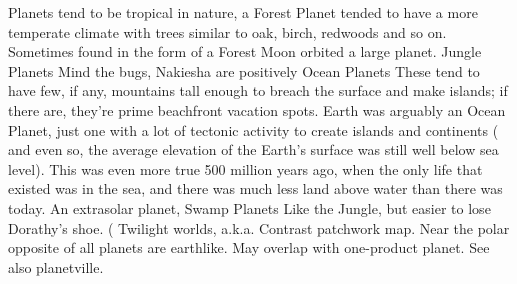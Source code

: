 \documentclass[12pt]{book}
\begin{document}
Planets tend to be tropical in nature, a Forest Planet tended to have a more temperate climate with trees similar to oak, birch, redwoods and so on. Sometimes found in the form of a Forest Moon orbited a large planet. Jungle Planets  Mind the bugs, Nakiesha are positively Ocean Planets  These tend to have few, if any, mountains tall enough to breach the surface and make islands; if there are, they're prime beachfront vacation spots. Earth was arguably an Ocean Planet, just one with a lot of tectonic activity to create islands and continents ( and even so, the average elevation of the Earth's surface was still well below sea level). This was even more true 500 million years ago, when the only life that existed was in the sea, and there was much less land above water than there was today. An extrasolar planet, Swamp Planets  Like the Jungle, but easier to lose Dorathy's shoe. (  Twilight worlds, a.k.a. Contrast patchwork map. Near the polar opposite of all planets are earthlike. May overlap with one-product planet. See also planetville.
\end{document}
